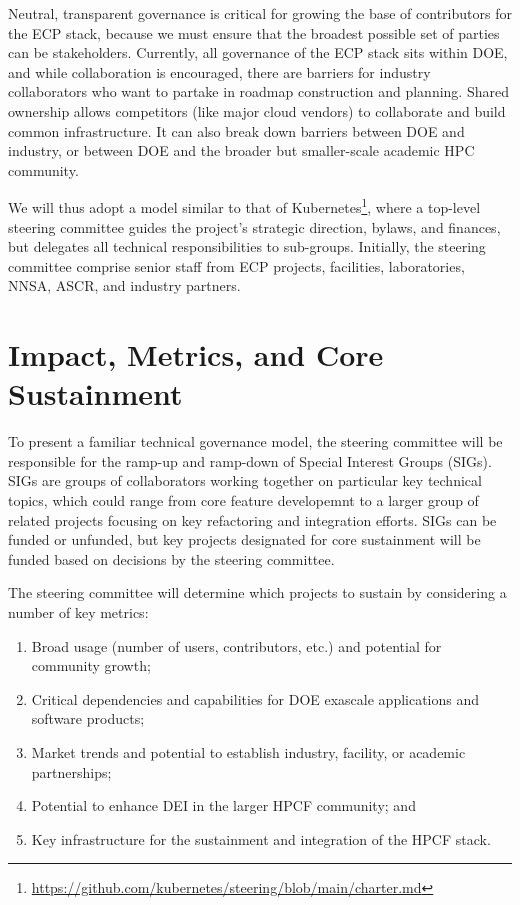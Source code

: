 \documentclass[11pt]{article}
\begin{document}
Neutral, transparent governance is critical for growing the base of contributors for the
ECP stack, because we must ensure that the broadest possible set of parties can be
stakeholders. Currently, all governance of the ECP stack sits within DOE, and while
collaboration is encouraged, there are barriers for industry collaborators who want to
partake in roadmap construction and planning. Shared ownership allows competitors (like
major cloud vendors) to collaborate and build common infrastructure. It can also break
down barriers between DOE and industry, or between DOE and the broader but smaller-scale
academic HPC community.

We will thus adopt a model similar to that of
Kubernetes\footnote{\href{https://github.com/kubernetes/steering/blob/main/charter.md}{https://github.com/kubernetes/steering/blob/main/charter.md}},
where a top-level steering committee guides the project's strategic direction, bylaws,
and finances, but delegates all technical responsibilities to sub-groups. Initially, the
steering committee comprise senior staff from ECP projects, facilities, laboratories,
NNSA, ASCR, and industry partners.

\section{Impact, Metrics, and Core Sustainment}

To present a familiar technical governance model, the steering committee will be
responsible for the ramp-up and ramp-down of Special Interest Groups (SIGs). SIGs are
groups of collaborators working together on particular key technical topics, which could
range from core feature developemnt to a larger group of related projects focusing on
key refactoring and integration efforts. SIGs can be funded or unfunded, but key
projects designated for core sustainment will be funded based on decisions by the
steering committee.

The steering committee will determine which projects to sustain by considering a number
of key metrics:

\begin{enumerate}
\item Broad usage (number of users, contributors, etc.) and potential for community
  growth;
\item Critical dependencies and capabilities for DOE exascale applications and software
  products;
\item Market trends and potential to establish industry, facility, or academic
  partnerships;
\item Potential to enhance DEI in the larger HPCF community; and
\item Key infrastructure for the sustainment and integration of the HPCF stack.
\end{enumerate}
\end{document}

